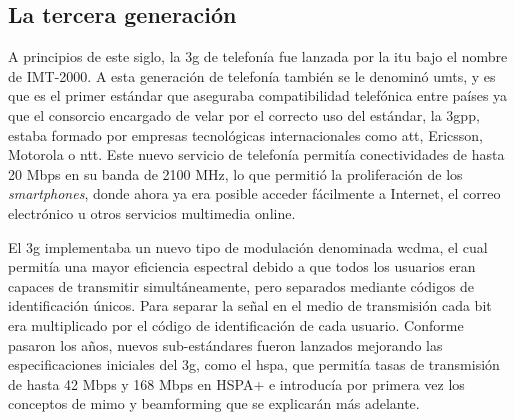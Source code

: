 \subsection{La tercera generación}
\par A principios de este siglo, la \gls{3g} de telefonía fue lanzada por la \gls{itu} bajo el nombre de IMT-2000. A esta generación de telefonía también se le denominó \gls{umts}, y es que es el primer estándar que aseguraba compatibilidad telefónica entre países ya que el consorcio encargado de velar por el correcto uso del estándar, la \gls{3gpp}, estaba formado por empresas tecnológicas internacionales como \gls{att}, Ericsson, Motorola o \gls{ntt}. Este nuevo servicio de telefonía permitía conectividades de hasta 20 Mbps en su banda de 2100 MHz, lo que permitió la proliferación de los \textit{smartphones}, donde ahora ya era posible acceder fácilmente a Internet, el correo electrónico u otros servicios multimedia online. 
\\
\par El \gls{3g} implementaba un nuevo tipo de modulación denominada \gls{wcdma}, el cual permitía una mayor eficiencia espectral debido a que todos los usuarios eran capaces de transmitir simultáneamente, pero separados mediante códigos de identificación únicos. Para separar la señal en el medio de transmisión cada bit era multiplicado por el código de identificación de cada usuario. Conforme pasaron los años, nuevos sub-estándares fueron lanzados mejorando las especificaciones iniciales del \gls{3g}, como el \gls{hspa}, que permitía tasas de transmisión de hasta 42 Mbps y 168 Mbps en HSPA+ e introducía por primera vez los conceptos de \gls{mimo} y beamforming que se explicarán más adelante.

